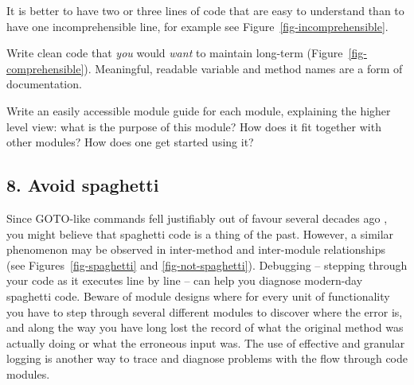 \documentclass{bmcart}
\begin{document}
It is better to have two or three lines of code that are easy to understand than to have one incomprehensible line, for example see Figure~\ref{fig-incomprehensible}. 


Write clean code \cite{cleancode} that \textit{you} would \textit{want} to maintain long-term (Figure~\ref{fig-comprehensible}). Meaningful, readable variable and method names are a form of documentation. 


Write an easily accessible module guide for each module, explaining the higher level view: what is the purpose of this module? How does it fit together with other modules? How does one get started using it? 

\subsection*{8. Avoid spaghetti}

Since GOTO-like commands fell justifiably out of favour several decades ago \cite{dijkstra1968}, you might believe that spaghetti code is a thing of the past. However, a similar phenomenon may be observed in inter-method and inter-module relationships (see Figures~\ref{fig-spaghetti} and \ref{fig-not-spaghetti}). Debugging -- stepping through your code as it executes line by line -- can help you diagnose modern-day spaghetti code. Beware of module designs where for every unit of functionality you have to step through several different modules to discover where the error is, and along the way you have long lost the record of what the original method was actually doing or what the erroneous input was. The use of effective and granular logging is another way to trace and diagnose problems with the flow through code modules. 

\end{document}
